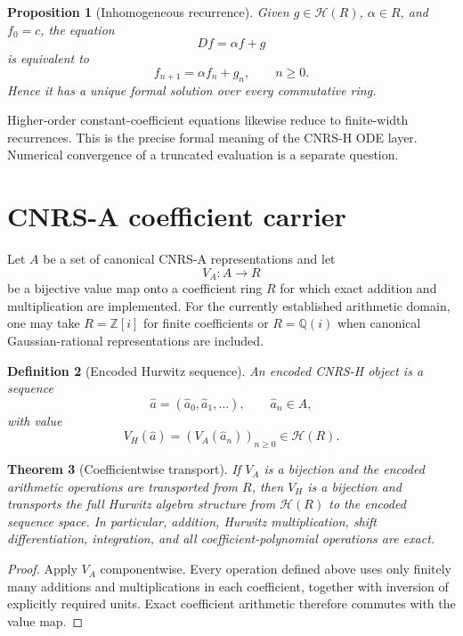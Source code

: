 \documentclass[11pt]{article}
\newtheorem{theorem}{Theorem}[section]
\newtheorem{proposition}[theorem]{Proposition}
\newtheorem{definition}[theorem]{Definition}
\newcommand{\Hurs}{\mathcal H}
\newcommand{\GI}{\mathbb Z[i]}
\newcommand{\GQ}{\mathbb Q(i)}
\begin{document}
\begin{proposition}[Inhomogeneous recurrence]
Given $g\in\Hurs(R)$, $\alpha\in R$, and $f_0=c$, the equation
\[
Df=\alpha f+g
\]
is equivalent to
\[
f_{n+1}=\alpha f_n+g_n,
\qquad n\ge0.
\]
Hence it has a unique formal solution over every commutative ring.
\end{proposition}

Higher-order constant-coefficient equations likewise reduce to finite-width recurrences.  This is the precise formal meaning of the CNRS-H ODE layer.  Numerical convergence of a truncated evaluation is a separate question.

\section{CNRS-A coefficient carrier}

Let $A$ be a set of canonical CNRS-A representations and let
\[
V_A:A\to R
\]
be a bijective value map onto a coefficient ring $R$ for which exact addition and multiplication are implemented.  For the currently established arithmetic domain, one may take $R=\GI$ for finite coefficients or $R=\GQ$ when canonical Gaussian-rational representations are included.

\begin{definition}[Encoded Hurwitz sequence]
An encoded CNRS-H object is a sequence
\[
\widehat a=(\widehat a_0,\widehat a_1,\ldots),\qquad \widehat a_n\in A,
\]
with value
\[
V_H(\widehat a)=(V_A(\widehat a_n))_{n\ge0}\in\Hurs(R).
\]
\end{definition}

\begin{theorem}[Coefficientwise transport]
If $V_A$ is a bijection and the encoded arithmetic operations are transported from $R$, then $V_H$ is a bijection and transports the full Hurwitz algebra structure from $\Hurs(R)$ to the encoded sequence space.  In particular, addition, Hurwitz multiplication, shift differentiation, integration, and all coefficient-polynomial operations are exact.
\end{theorem}

\begin{proof}
Apply $V_A$ componentwise.  Every operation defined above uses only finitely many additions and multiplications in each coefficient, together with inversion of explicitly required units.  Exact coefficient arithmetic therefore commutes with the value map.
\end{proof}
\end{document}
